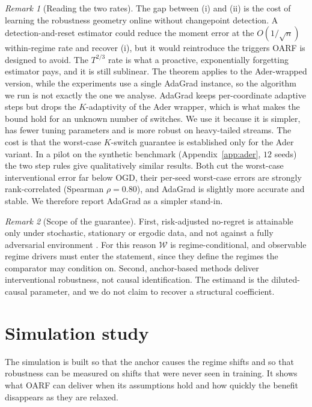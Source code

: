 \documentclass[12pt]{article}
\theoremstyle{plain}
\theoremstyle{remark}
\newtheorem{remark}{Remark}
\newcommand{\OARF}{\textsc{OARF}}
\begin{document}
\begin{remark}[Reading the two rates]\label{rem:rates}
The gap between (i) and (ii) is the cost of learning the robustness geometry online
without changepoint detection. A detection-and-reset estimator could reduce the moment
error at the $O(1/\sqrt{n})$ within-regime rate and recover (i), but it would
reintroduce the triggers \OARF{} is designed to avoid. The $T^{2/3}$ rate is what a
proactive, exponentially forgetting estimator pays, and it is still sublinear. The theorem applies to the Ader-wrapped
version, while the experiments use a single AdaGrad instance, so the algorithm we run
is not exactly the one we analyse. AdaGrad keeps per-coordinate adaptive steps but
drops the $K$-adaptivity of the Ader wrapper, which is what makes the bound hold for
an unknown number of switches. We use it because it is simpler, has fewer tuning
parameters and is more robust on heavy-tailed streams. The cost is that the worst-case
$K$-switch guarantee is established only for the Ader variant. In a pilot on the
synthetic benchmark (Appendix~\ref{app:ader}, $12$ seeds) the two step rules give
qualitatively similar results. Both cut the worst-case interventional error far below
OGD, their per-seed worst-case errors are strongly rank-correlated (Spearman
$\rho=0.80$), and AdaGrad is slightly more accurate and stable. We therefore report
AdaGrad as a simpler stand-in.
\end{remark}

\begin{remark}[Scope of the guarantee]\label{rem:honesty}
First, risk-adjusted no-regret is attainable only under
stochastic, stationary or ergodic data, and not against a fully adversarial
environment \citep{uziel2017growth}. For this reason $\mathcal{W}$ is
regime-conditional, and observable regime drivers must enter the statement, since they
define the regimes the comparator may condition on. Second, anchor-based methods
deliver interventional robustness, not causal identification. The estimand is the
diluted-causal parameter, and we do not claim to recover a structural coefficient.
\end{remark}

\section{Simulation study}\label{sec:synth}

The simulation is built so that the anchor causes the regime shifts and so that
robustness can be measured on shifts that were never seen in training. It shows what
\OARF{} can deliver when its assumptions hold and how quickly the benefit disappears
as they are relaxed.
\end{document}
